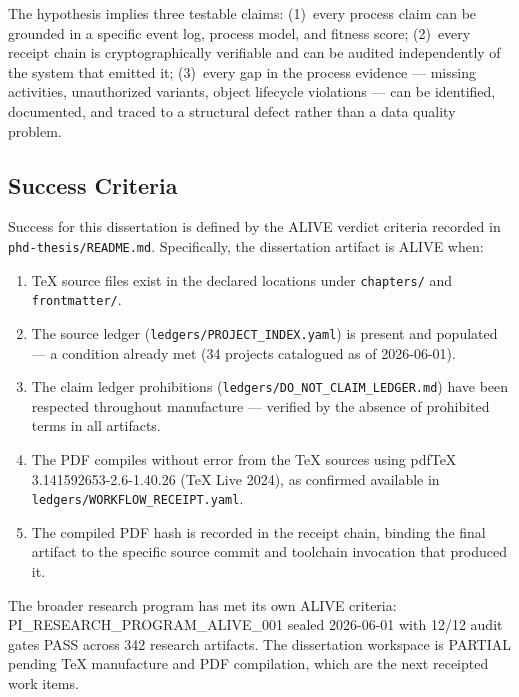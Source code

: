 The hypothesis implies three testable claims: (1)~every process claim can be grounded in a
specific event log, process model, and fitness score; (2)~every receipt chain is
cryptographically verifiable and can be audited independently of the system that emitted it;
(3)~every gap in the process evidence --- missing activities, unauthorized variants, object
lifecycle violations --- can be identified, documented, and traced to a structural defect
rather than a data quality problem.

\subsection{Success Criteria}
\label{sec:phd-thesis-question-success}

Success for this dissertation is defined by the ALIVE verdict criteria recorded in
\texttt{phd-thesis/README.md}. Specifically, the dissertation artifact is ALIVE when:

\begin{enumerate}
  \item TeX source files exist in the declared locations under \texttt{chapters/} and
    \texttt{frontmatter/}.
  \item The source ledger (\texttt{ledgers/PROJECT\_INDEX.yaml}) is present and populated ---
    a condition already met (34 projects catalogued as of 2026-06-01).
  \item The claim ledger prohibitions (\texttt{ledgers/DO\_NOT\_CLAIM\_LEDGER.md}) have been
    respected throughout manufacture --- verified by the absence of prohibited terms in all
    artifacts.
  \item The PDF compiles without error from the TeX sources using pdfTeX 3.141592653-2.6-1.40.26
    (TeX Live 2024), as confirmed available in \texttt{ledgers/WORKFLOW\_RECEIPT.yaml}.
  \item The compiled PDF hash is recorded in the receipt chain, binding the final artifact to
    the specific source commit and toolchain invocation that produced it.
\end{enumerate}

The broader research program has met its own ALIVE criteria: PI\_RESEARCH\_PROGRAM\_ALIVE\_001
sealed 2026-06-01 with 12/12 audit gates PASS across 342 research artifacts. The dissertation
workspace is PARTIAL pending TeX manufacture and PDF compilation, which are the next receipted
work items.
